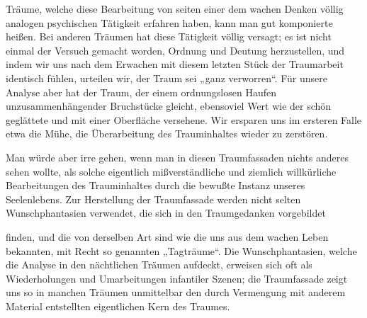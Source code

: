 \documentclass[twoside=true,titlepage=false,open=any, parskip=never, fontsize=10pt, headings=small, chapterprefix=false, appendixprefix=false]{scrbook}
\begin{document}
            
        \pstart
        Träume, welche diese Bearbeitung von seiten einer dem wachen Denken völlig
               analogen psychischen Tätigkeit erfahren haben, kann man gut komponierte heißen. Bei anderen Träumen hat
               diese Tätigkeit völlig versagt; es ist nicht einmal der Versuch gemacht worden,
               Ordnung und Deutung herzustellen, und indem wir uns nach dem Erwachen mit diesem
               letzten Stück der Traumarbeit identisch fühlen, urteilen wir, der
               Traum sei „ganz verworren“. Für unsere Analyse aber hat der Traum,
               der einem ordnungslosen Haufen unzusammenhängender Bruchstücke gleicht,
               ebensoviel Wert wie der schön geglättete und mit einer Oberfläche
               versehene. Wir ersparen uns im ersteren Falle etwa die Mühe, die Überarbeitung
               des Trauminhaltes wieder zu zerstören.
        \pend
    
            
        \pstart
        Man würde aber irre gehen, wenn man in diesen Traumfassaden nichts
               anderes sehen wollte, als solche eigentlich mißverständliche und
               ziemlich willkürliche Bearbeitungen des Trauminhaltes durch die
               bewußte Instanz unseres Seelenlebens. Zur Herstellung der Traumfassade werden
               nicht selten Wunschphantasien verwendet, die sich in den
               Traumgedanken vorgebildet
        \pend
    
         
            
            
            
        \pstart
        finden, und die von derselben Art sind wie die uns aus dem wachen
               Leben bekannten, mit Recht so genannten „Tagträume“. Die Wunschphantasien,
               welche die Analyse in den nächtlichen Träumen aufdeckt, erweisen sich oft als
               Wiederholungen und Umarbeitungen infantiler Szenen; die Traumfassade zeigt uns
               so in manchen Träumen unmittelbar den durch Vermengung mit anderem Material
               entstellten eigentlichen Kern des Traumes.
        \pend
    
\end{document}
